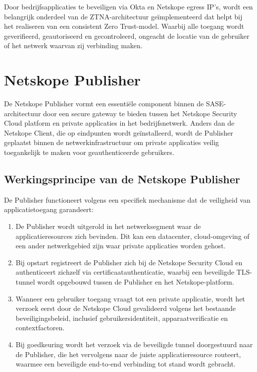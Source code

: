 Door bedrijfsapplicaties te beveiligen via Okta en Netskope egress IP's, wordt een belangrijk onderdeel van de ZTNA-architectuur geïmplementeerd dat helpt bij het realiseren van een consistent Zero Trust-model. Waarbij alle toegang wordt geverifieerd, geautoriseerd en gecontroleerd, ongeacht de locatie van de gebruiker of het netwerk waarvan zij verbinding maken.

\section{Netskope Publisher}

De Netskope Publisher vormt een essentiële component binnen de SASE-architectuur door een secure gateway te bieden tussen het Netskope Security Cloud platform en private applicaties in het bedrijfsnetwerk. Anders dan de Netskope Client, die op eindpunten wordt geïnstalleerd, wordt de Publisher geplaatst binnen de netwerkinfrastructuur om private applicaties veilig toegankelijk te maken voor geauthenticeerde gebruikers.

\subsection{Werkingsprincipe van de Netskope Publisher}

De Publisher functioneert volgens een specifiek mechanisme dat de veiligheid van applicatietoegang garandeert:

\begin{enumerate}
    \item De Publisher wordt uitgerold in het netwerksegment waar de applicatieresources zich bevinden. Dit kan een datacenter, cloud-omgeving of een ander netwerkgebied zijn waar private applicaties worden gehost.

    \item Bij opstart registreert de Publisher zich bij de Netskope Security Cloud en authenticeert zichzelf via certificaatauthenticatie, waarbij een beveiligde TLS-tunnel wordt opgebouwd tussen de Publisher en het Netskope-platform.

    \item Wanneer een gebruiker toegang vraagt tot een private applicatie, wordt het verzoek eerst door de Netskope Cloud gevalideerd volgens het bestaande beveiligingsbeleid, inclusief gebruikersidentiteit, apparaatverificatie en contextfactoren.

    \item Bij goedkeuring wordt het verzoek via de beveiligde tunnel doorgestuurd naar de Publisher, die het vervolgens naar de juiste applicatieresource routeert, waarmee een beveiligde end-to-end verbinding tot stand wordt gebracht.
\end{enumerate}

